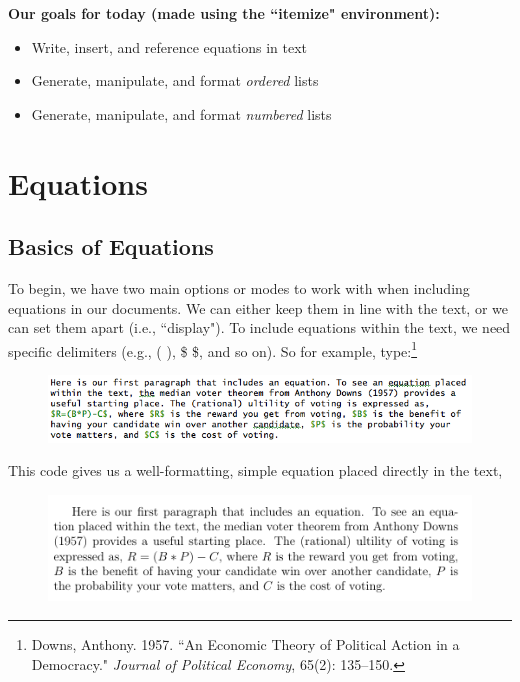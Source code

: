 \documentclass[11pt]{article}
\newcommand{\forceindent}{\leavevmode{\parindent=1.5em\indent}} %
\begin{document}
\textbf{Our goals for today (made using the ``itemize" environment):}

\begin{itemize}
	\item Write, insert, and reference equations in text
	\item Generate, manipulate, and format \textit{ordered} lists
	\item Generate, manipulate, and format \textit{numbered} lists
\end{itemize}

\newpage 

\section{Equations}

\subsection{Basics of Equations}

\forceindent To begin, we have two main options or modes to work with when including equations in our documents. We can either keep them in line with the text, or we can set them apart (i.e., ``display"). To include equations within the text, we need specific delimiters (e.g., ( ), \$ \$, and so on). So for example, type:\footnote{Downs, Anthony. 1957. ``An Economic Theory of Political Action in a Democracy." \textit{Journal of Political Economy}, 65(2): 135--150.} \\


\begin{figure}[!h]
	\includegraphics[scale=.5]{CODE1} \\
	\centering
\end{figure}

This code gives us a well-formatting, simple equation placed directly in the text,

\begin{figure}[!h]
	\includegraphics[scale=.5]{OUT1} \\
	\centering
\end{figure}
\end{document}
